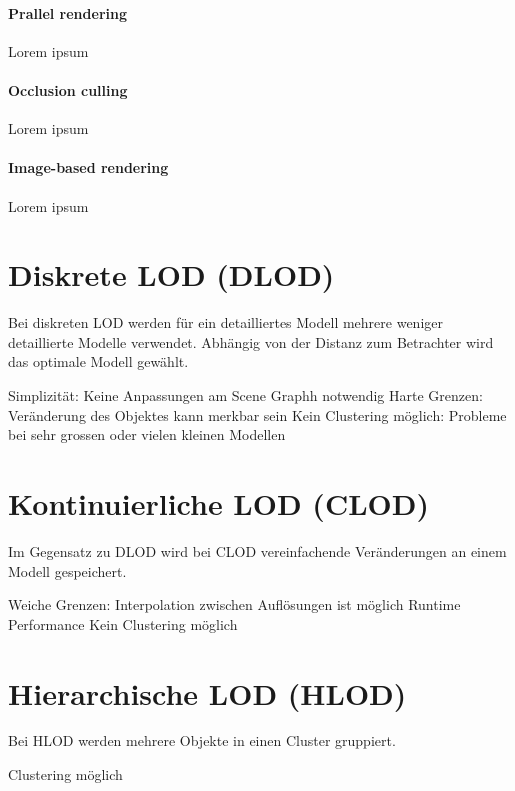\paragraph{Prallel rendering}
Lorem ipsum

\paragraph{Occlusion culling}
Lorem ipsum

\paragraph{Image-based rendering}
Lorem ipsum


\section{Diskrete LOD (DLOD)}
Bei diskreten LOD werden für ein detailliertes Modell mehrere weniger detaillierte Modelle verwendet.
Abhängig von der Distanz zum Betrachter wird das optimale Modell gewählt.
\begin{itemize}
  \pro Simplizität: Keine Anpassungen am Scene Graphh notwendig
  \con Harte Grenzen: Veränderung des Objektes kann merkbar sein
  \con Kein Clustering möglich: Probleme bei sehr grossen oder vielen kleinen Modellen
\end{itemize}

\section{Kontinuierliche LOD (CLOD)}
Im Gegensatz zu DLOD wird bei CLOD vereinfachende Veränderungen an einem Modell gespeichert.
\begin{itemize}
  \pro Weiche Grenzen: Interpolation zwischen Auflösungen ist möglich
  \con Runtime Performance
  \con Kein Clustering möglich
\end{itemize}

\section{Hierarchische LOD (HLOD)}
Bei HLOD werden mehrere Objekte in einen Cluster gruppiert.
\begin{itemize}
  \pro Clustering möglich
\end{itemize}

